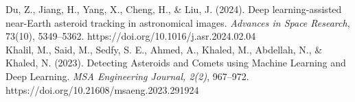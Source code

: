 \documentclass[12pt]{article}
\begin{document}
Du, Z., Jiang, H., Yang, X., Cheng, H., \& Liu, J. (2024). Deep learning-assisted near-Earth asteroid tracking in astronomical images. \textit{Advances in Space Research}, 73(10), 5349–5362. https://doi.org/10.1016/j.asr.2024.02.04\\

Khalil, M., Said, M., Sedfy, S. E., Ahmed, A., Khaled, M., Abdellah, N., \& Khaled, N. (2023). Detecting Asteroids and Comets using Machine Learning and Deep Learning. \textit{MSA Engineering Journal, 2(2)}, 967–972. \\ https://doi.org/10.21608/msaeng.2023.291924\\

\medskip
\end{document}
